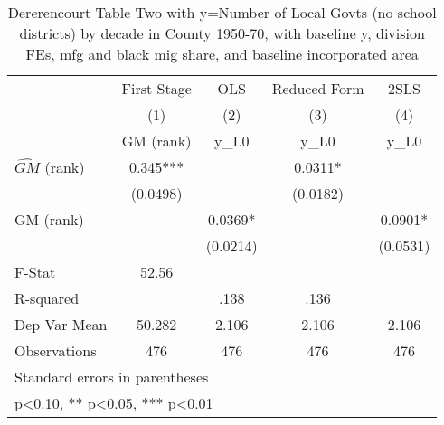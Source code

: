 \begin{table}[htbp]\centering
\def\sym#1{\ifmmode^{#1}\else\(^{#1}\)\fi}
\caption{Dererencourt Table Two with y=Number of Local Govts (no school districts) by decade in County 1950-70, with baseline y, division FEs, mfg and black mig share, and baseline incorporated area}
\begin{tabular}{l*{4}{c}}
\toprule
                    & First Stage   &         OLS   &Reduced Form   &        2SLS   \\
                    &\multicolumn{1}{c}{(1)}&\multicolumn{1}{c}{(2)}&\multicolumn{1}{c}{(3)}&\multicolumn{1}{c}{(4)}\\
                    &\multicolumn{1}{c}{GM  (rank)}&\multicolumn{1}{c}{y\_L0}&\multicolumn{1}{c}{y\_L0}&\multicolumn{1}{c}{y\_L0}\\
\midrule
$\hat{GM}$ (rank)   &       0.345***&               &      0.0311*  &               \\
                    &    (0.0498)   &               &    (0.0182)   &               \\
\addlinespace
GM  (rank)          &               &      0.0369*  &               &      0.0901*  \\
                    &               &    (0.0214)   &               &    (0.0531)   \\
\midrule
F-Stat              &       52.56   &               &               &               \\
R-squared           &               &        .138   &        .136   &               \\
Dep Var Mean        &      50.282   &       2.106   &       2.106   &       2.106   \\
Observations        &         476   &         476   &         476   &         476   \\
\bottomrule
\multicolumn{5}{l}{\footnotesize Standard errors in parentheses}\\
\multicolumn{5}{l}{\footnotesize * p<0.10, ** p<0.05, *** p<0.01}\\
\end{tabular}
\end{table}
